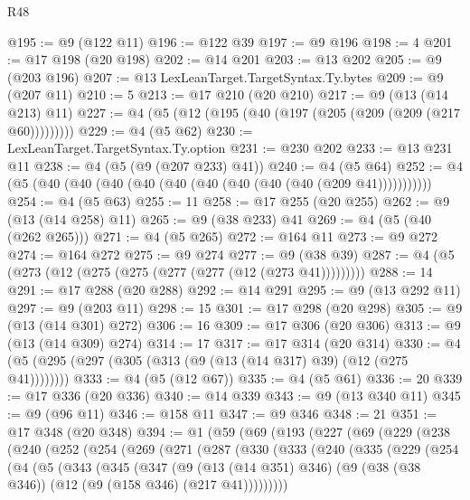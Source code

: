 \begin{lexlean}{R48}
\begin{coremodule}
@195 := @9 (@122 @11)
@196 := @122 @39
@197 := @9 @196
@198 := 4
@201 := @17 @198 (@20 @198)
@202 := @14 @201
@203 := @13 @202
@205 := @9 (@203 @196)
@207 := @13 LexLeanTarget.TargetSyntax.Ty.bytes
@209 := @9 (@207 @11)
@210 := 5
@213 := @17 @210 (@20 @210)
@217 := @9 (@13 (@14 @213) @11)
@227 := @4 (@5 (@12 (@195 (@40 (@197 (@205 (@209 (@209 (@217 @60)))))))))
@229 := @4 (@5 @62)
@230 := LexLeanTarget.TargetSyntax.Ty.option
@231 := @230 @202
@233 := @13 @231 @11
@238 := @4 (@5 (@9 (@207 @233) @41))
@240 := @4 (@5 @64)
@252 := @4 (@5 (@40 (@40 (@40 (@40 (@40 (@40 (@40 (@40 (@40 (@209 @41)))))))))))
@254 := @4 (@5 @63)
@255 := 11
@258 := @17 @255 (@20 @255)
@262 := @9 (@13 (@14 @258) @11)
@265 := @9 (@38 @233) @41
@269 := @4 (@5 (@40 (@262 @265)))
@271 := @4 (@5 @265)
@272 := @164 @11
@273 := @9 @272
@274 := @164 @272
@275 := @9 @274
@277 := @9 (@38 @39)
@287 := @4 (@5 (@273 (@12 (@275 (@275 (@277 (@277 (@12 (@273 @41)))))))))
@288 := 14
@291 := @17 @288 (@20 @288)
@292 := @14 @291
@295 := @9 (@13 @292 @11)
@297 := @9 (@203 @11)
@298 := 15
@301 := @17 @298 (@20 @298)
@305 := @9 (@13 (@14 @301) @272)
@306 := 16
@309 := @17 @306 (@20 @306)
@313 := @9 (@13 (@14 @309) @274)
@314 := 17
@317 := @17 @314 (@20 @314)
@330 := @4 (@5 (@295 (@297 (@305 (@313 (@9 (@13 (@14 @317) @39) (@12 (@275 @41))))))))
@333 := @4 (@5 (@12 @67))
@335 := @4 (@5 @61)
@336 := 20
@339 := @17 @336 (@20 @336)
@340 := @14 @339
@343 := @9 (@13 @340 @11)
@345 := @9 (@96 @11)
@346 := @158 @11
@347 := @9 @346
@348 := 21
@351 := @17 @348 (@20 @348)
@394 := @1
    (@59
      (@69
        (@193
          (@227
            (@69
              (@229
                (@238
                  (@240
                    (@252
                      (@254
                        (@269
                          (@271
                            (@287
                              (@330
                                (@333
                                  (@240
                                    (@335
                                      (@229
                                        (@254
                                          (@4
                                            (@5
                                              (@343
                                                (@345
                                                  (@347
                                                    (@9
                                                      (@13 (@14 @351) @346)
                                                      (@9
                                                        (@38 (@38 @346))
                                                        (@12 (@9 (@158 @346) (@217 @41)))))))))

\end{coremodule}
\end{lexlean}
